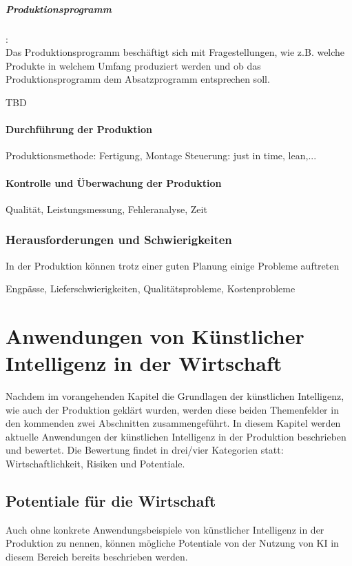 \documentclass[a4paper,12pt, german]{report}
\begin{document}
\paragraph{Produktionsprogramm}: $ $ \\ Das Produktionsprogramm beschäftigt sich mit Fragestellungen, wie z.B. welche Produkte in welchem Umfang produziert werden und ob das Produktionsprogramm dem Absatzprogramm entsprechen soll. 

TBD



\subsubsection{Durchführung der Produktion}
Produktionsmethode: Fertigung, Montage
Steuerung: just in time, lean,...

\subsubsection{Kontrolle und Überwachung der Produktion}

Qualität, Leistungsmessung, Fehleranalyse, Zeit

\subsection{Herausforderungen und Schwierigkeiten}
In der Produktion können trotz einer guten Planung einige Probleme auftreten

Engpässe, Lieferschwierigkeiten, Qualitätsprobleme, Kostenprobleme


\chapter{Anwendungen von Künstlicher Intelligenz in der Wirtschaft}

Nachdem im vorangehenden Kapitel die Grundlagen der künstlichen Intelligenz, wie auch der Produktion geklärt wurden, werden diese beiden Themenfelder in den kommenden zwei Abschnitten zusammengeführt. In diesem Kapitel werden aktuelle Anwendungen der künstlichen Intelligenz in der Produktion beschrieben und bewertet. Die Bewertung findet in drei/vier Kategorien statt: Wirtschaftlichkeit, Risiken und Potentiale.

\section{Potentiale für die Wirtschaft}
Auch ohne konkrete Anwendungsbeispiele von künstlicher Intelligenz in der Produktion zu nennen, können mögliche Potentiale von der Nutzung von KI in diesem Bereich bereits beschrieben werden.
\end{document}
